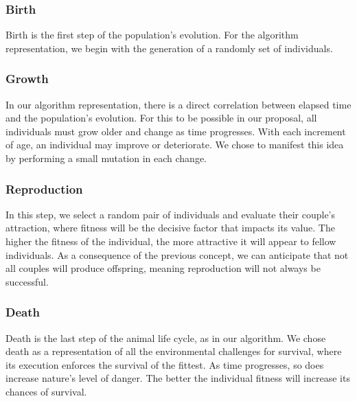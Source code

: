 \documentclass[graybox]{svmult}
\begin{document}
        \subsubsection{Birth} Birth is the first step of the population's
        evolution. For the algorithm representation, we begin with the
        generation of a randomly set of individuals.
        
        \subsubsection{Growth} In our algorithm representation, there is a
        direct correlation between elapsed time and the population's evolution.
        For this to be possible in our proposal, all individuals must grow
        older and change as time progresses. With each increment of age, an
        individual may improve or deteriorate. We chose to manifest this idea
        by performing a small mutation in each change.

        \subsubsection{Reproduction} In this step, we select a random pair of
        individuals and evaluate their couple's attraction, where fitness will
        be the decisive factor that impacts its value. The higher the fitness
        of the individual, the more attractive it will appear to fellow
        individuals. As a consequence of the previous concept, we can
        anticipate that not all couples will produce offspring, meaning
        reproduction will not always be successful.
        
        \subsubsection{Death} Death is the last step of the animal life cycle,
        as in our algorithm. We chose death as a representation of all the
        environmental challenges for survival, where its execution enforces the
        survival of the fittest. As time progresses, so does increase nature's
        level of danger. The better the individual fitness will increase its
        chances of survival.
        
\end{document}
